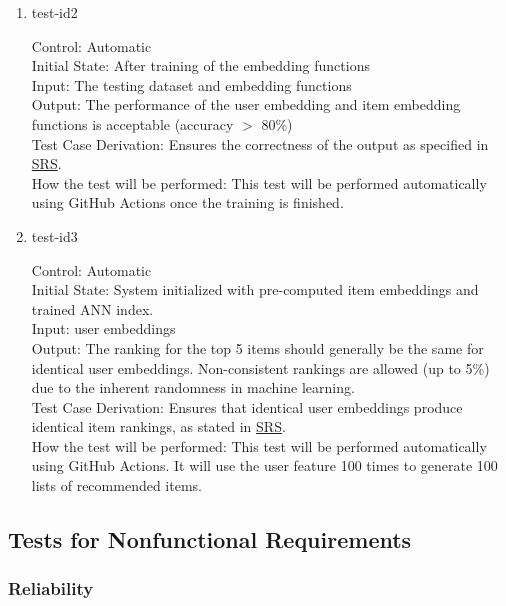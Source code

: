 \documentclass[12pt, titlepage]{article}
\begin{document}
\begin{enumerate}
  \item{test-id2\\}

  Control: Automatic\\
  Initial State: After training of the embedding functions\\
  Input: The testing dataset and embedding functions\\
  Output: The performance of the user embedding and item embedding functions is acceptable (accuracy $>$ 80\%)\\
  Test Case Derivation: Ensures the correctness of the output as specified in \href{https://github.com/V-AS/Two-tower-recommender-system/blob/main/docs/SRS/SRS.pdf}{SRS}.\\
  How the test will be performed: This test will be performed automatically using GitHub Actions once the training is finished.

\item{test-id3\\}

Control: Automatic\\
Initial State: System initialized with pre-computed item embeddings and trained ANN index.\\
Input:  user embeddings\\
Output: The ranking for the top 5 items should generally be the same for identical user embeddings. Non-consistent rankings are allowed (up to 5\%) due to the inherent randomness in machine learning.\\
Test Case Derivation: Ensures that identical user embeddings produce identical item rankings, as stated in \href{https://github.com/V-AS/Two-tower-recommender-system/blob/main/docs/SRS/SRS.pdf}{SRS}.\\
How the test will be performed: This test will be performed automatically using GitHub Actions. It will use the user feature 100 times to generate 100 lists of recommended items.\\

\end{enumerate}


\subsection{Tests for Nonfunctional Requirements}

\subsubsection{Reliability}
\end{document}
